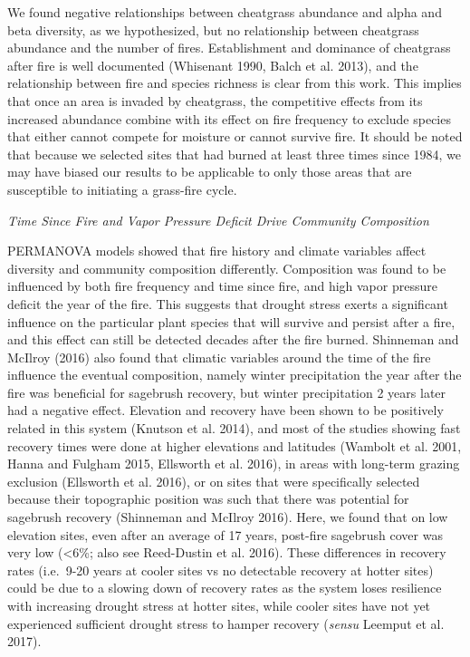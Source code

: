 \documentclass[12pt,]{article}
\begin{document}
We found negative relationships between cheatgrass abundance and alpha
and beta diversity, as we hypothesized, but no relationship between
cheatgrass abundance and the number of fires. Establishment and
dominance of cheatgrass after fire is well documented (Whisenant 1990,
Balch et al. 2013), and the relationship between fire and species
richness is clear from this work. This implies that once an area is
invaded by cheatgrass, the competitive effects from its increased
abundance combine with its effect on fire frequency to exclude species
that either cannot compete for moisture or cannot survive fire. It
should be noted that because we selected sites that had burned at least
three times since 1984, we may have biased our results to be applicable
to only those areas that are susceptible to initiating a grass-fire
cycle.

\emph{Time Since Fire and Vapor Pressure Deficit Drive Community
Composition}

PERMANOVA models showed that fire history and climate variables affect
diversity and community composition differently. Composition was found
to be influenced by both fire frequency and time since fire, and high
vapor pressure deficit the year of the fire. This suggests that drought
stress exerts a significant influence on the particular plant species
that will survive and persist after a fire, and this effect can still be
detected decades after the fire burned. Shinneman and McIlroy (2016)
also found that climatic variables around the time of the fire influence
the eventual composition, namely winter precipitation the year after the
fire was beneficial for sagebrush recovery, but winter precipitation 2
years later had a negative effect. Elevation and recovery have been
shown to be positively related in this system (Knutson et al. 2014), and
most of the studies showing fast recovery times were done at higher
elevations and latitudes (Wambolt et al. 2001, Hanna and Fulgham 2015,
Ellsworth et al. 2016), in areas with long-term grazing exclusion
(Ellsworth et al. 2016), or on sites that were specifically selected
because their topographic position was such that there was potential for
sagebrush recovery (Shinneman and McIlroy 2016). Here, we found that on
low elevation sites, even after an average of 17 years, post-fire
sagebrush cover was very low (\textless{}6\%; also see Reed-Dustin et
al. 2016). These differences in recovery rates (i.e.~9-20 years at
cooler sites vs no detectable recovery at hotter sites) could be due to
a slowing down of recovery rates as the system loses resilience with
increasing drought stress at hotter sites, while cooler sites have not
yet experienced sufficient drought stress to hamper recovery
(\emph{sensu} Leemput et al. 2017).
\end{document}
